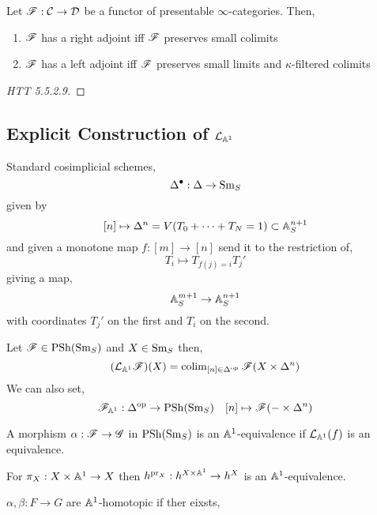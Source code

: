 \documentclass[12pt]{article}
\begin{document}
\begin{theorem}
Let $\mathscr{F} : \mathcal{C} \to \mathcal{D}$ be a functor of presentable $\infty$-categories. Then,
\begin{enumerate}
\item $\mathscr{F}$ has a right adjoint iff $\mathscr{F}$ preserves small colimits
\item $\mathscr{F}$ has a left adjoint iff $\mathscr{F}$ preserves small limits and $\kappa$-filtered colimits 
\end{enumerate}
\end{theorem}

\begin{proof}
[HTT 5.5.2.9]
\end{proof}

\subsection{Explicit Construction of $\mathcal{L}_{\mathbb{A}^1}$}

\begin{defn}
Standard cosimplicial schemes,
\[ \Delta^\bullet : \Delta \to \mathrm{Sm}_S \]
given by 
\[ [n] \mapsto \Delta^n = V(T_0 + \cdots + T_N = 1) \subset \mathbb{A}^{n+1}_S \]
and given a monotone map $f : [m] \to [n]$ send it to the restriction of,
\[ T_i \mapsto T_{f(j) = i} T_j' \]
giving a map,
\[ \mathbb{A}^{m+1}_S \to \mathbb{A}_S^{n+1} \]
with coordinates $T_j'$ on the first and $T_i$ on the second. 
\end{defn}

\begin{theorem}[A25 of Primer]
Let $\mathscr{F} \in \mathrm{PSh}(\mathrm{Sm}_S)$ and $X \in \mathrm{Sm}_S$ then,
\[ (\mathcal{L}_{\mathbb{A}^1} \mathscr{F})(X) = \operatorname{\mathrm{colim}}_{[n] \in \Delta^{\mathrm{op}}} \mathscr{F}(X \times \Delta^n) \]
We can also set,
\[ \mathscr{F}_{\mathbb{A}^1} : \Delta^{\mathrm{op}} \to \mathrm{PSh}(\mathrm{Sm}_S) \quad [n] \mapsto \mathscr{F}(- \times \Delta^n) \]
\end{theorem}

\begin{defn}
A morphism $\alpha : \mathscr{F} \to \mathscr{G}$ in $\mathrm{PSh}(\mathrm{Sm}_S)$ is an $\mathbb{A}^1$-equivalence if $\mathcal{L}_{\mathbb{A}^1}(f)$ is an equivalence. 
\end{defn}

\begin{rmk}
For $\pi_X : X \times \mathbb{A}^1 \to X$ then $h^{\mathrm{pr}_X} : h^{X \times \mathbb{A}^1} \to h^X$ is an $\mathbb{A}^1$-equivalence. 
\end{rmk}

\begin{defn}
$\alpha, \beta : F \to G$ are $\mathbb{A}^1$-homotopic if ther eixsts,
\begin{center}
\end{center}
\end{defn}
\end{document}
